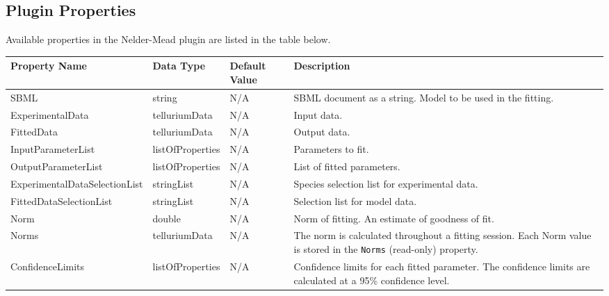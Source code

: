 \begin{landscape}
\section{Plugin Properties}
Available properties in the Nelder-Mead plugin are listed in the table below.

\centering %
\begin{longtable}{p{4cm} l p{3cm}  p{10cm}} %

Property Name & Data Type & Default Value  & Description \\ [0.5ex] %
\hline %
SBML                            &   string              & N/A    &   SBML document as a string. Model to be used in the fitting. \\
ExperimentalData   				&	telluriumData 		& N/A    &   Input data.  \\
FittedData      				& 	telluriumData    	& N/A    &   Output data. \\
InputParameterList 				&	listOfProperties    & N/A    &   Parameters to fit. \\
OutputParameterList 			&   listOfProperties 	& N/A    &   List of fitted parameters. \\
Experimental\-DataSelectionList & 	stringList			& N/A    &   Species selection list for experimental data. \\
FittedDataSelectionList     	& 	stringList			& N/A    &   Selection list for model data. \\
Norm							&	double				& N/A    &   Norm of fitting. An estimate of goodness of fit. \\
Norms							&	telluriumData		& N/A    &   The norm is calculated throughout a fitting session. Each Norm value is stored in the 	\verb|Norms| (read-only) property. \\

ConfidenceLimits				&	listOfProperties	& N/A    &   Confidence limits for each fitted parameter. The confidence limits are calculated at a 95\% confidence level. \\


\end{longtable}
\end{landscape}
